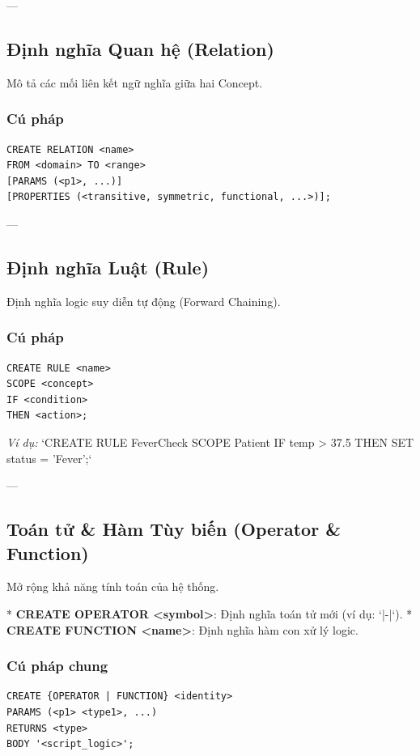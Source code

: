 ---

\subsection{Định nghĩa Quan hệ (Relation)}

Mô tả các mối liên kết ngữ nghĩa giữa hai Concept.

\subsubsection{Cú pháp}
\begin{verbatim}
CREATE RELATION <name> 
FROM <domain> TO <range>
[PARAMS (<p1>, ...)]
[PROPERTIES (<transitive, symmetric, functional, ...>)];
\end{verbatim}

---

\subsection{Định nghĩa Luật (Rule)}

Định nghĩa logic suy diễn tự động (Forward Chaining).

\subsubsection{Cú pháp}
\begin{verbatim}
CREATE RULE <name>
SCOPE <concept>
IF <condition>
THEN <action>;
\end{verbatim}
\textit{Ví dụ:} `CREATE RULE FeverCheck SCOPE Patient IF temp > 37.5 THEN SET status = 'Fever';`

---

\subsection{Toán tử & Hàm Tùy biến (Operator & Function)}

Mở rộng khả năng tính toán của hệ thống.

*   \textbf{CREATE OPERATOR <symbol>}: Định nghĩa toán tử mới (ví dụ: `|-|`).
*   \textbf{CREATE FUNCTION <name>}: Định nghĩa hàm con xử lý logic.

\subsubsection{Cú pháp chung}
\begin{verbatim}
CREATE {OPERATOR | FUNCTION} <identity>
PARAMS (<p1> <type1>, ...)
RETURNS <type>
BODY '<script_logic>';
\end{verbatim}

